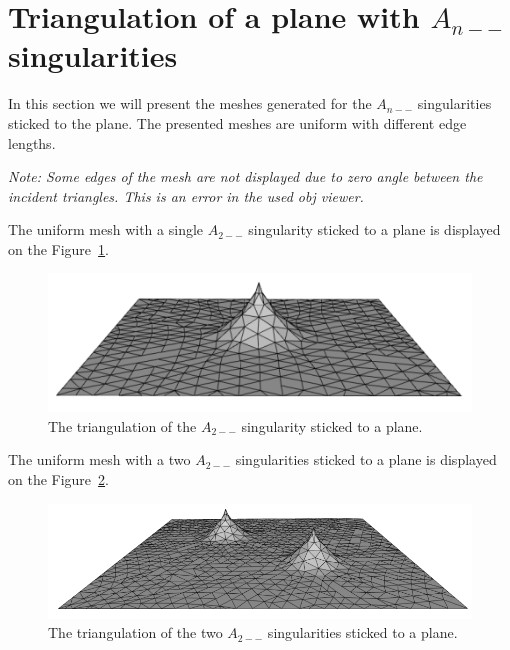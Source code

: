 \clearpage
\section{Triangulation of a plane with $A_{n--}$ singularities}
In this section we will present the meshes generated for the $A_{n--}$ singularities
sticked to the plane. The presented meshes are uniform with different edge lengths.

\textit{Note: Some edges of the mesh are not displayed due to zero angle between the incident
triangles. This is an error in the used obj viewer.}

The uniform mesh with a single $A_{2--}$ singularity sticked to a plane is displayed
on the Figure~\ref{img:84}.

\begin{figure}[h!]
    \centerline{\includegraphics[scale=0.5]{images/img84}}
    \caption[The triangulation of the $A_{2--}$ singularity sticked to a plane]
    {The triangulation of the $A_{2--}$ singularity sticked to a plane.}
    \label{img:84}
\end{figure}

The uniform mesh with a two $A_{2--}$ singularities sticked to a plane is displayed
on the Figure~\ref{img:85}.

\begin{figure}[h!]
    \centerline{\includegraphics[scale=0.5]{images/img85}}
    \caption[The triangulation of the two $A_{2--}$ singularities sticked to a plane]
    {The triangulation of the two $A_{2--}$ singularities sticked to a plane.}
    \label{img:85}
\end{figure}

